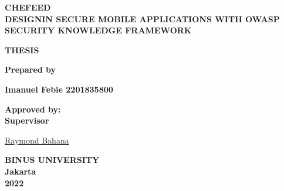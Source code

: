 \newpage

\begingroup
    \centering
    {\Large\bfseries CHEFEED} \\
    {\large\bfseries DESIGNIN SECURE MOBILE APPLICATIONS WITH OWASP SECURITY KNOWLEDGE FRAMEWORK}

    \vspace{1.5cm}
    
    {\Large\bfseries THESIS}
    
    \vspace{1.5cm}

    {\large\bfseries Prepared by}

    \vspace{1.5cm}

    {\large\bfseries Imanuel Febie 2201835800}

    \vspace{1.5cm}
    
    \begin{flushleft}
        \bfseries
        Approved by: \\
        Supervisor \\

        \vspace{2cm}

        \underline{Raymond Bahana} \\
    \end{flushleft}

    \vspace{1.5cm}

    {\large\bfseries BINUS UNIVERSITY \\ Jakarta \\ 2022}

\endgroup
